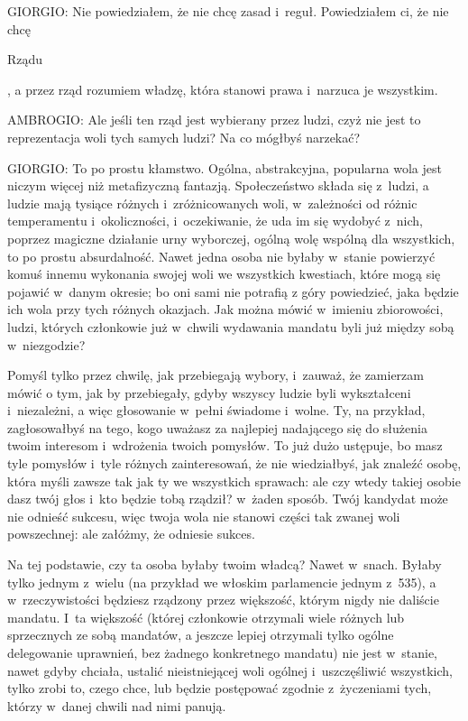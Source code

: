 \documentclass[oneside,polish,11pt,sfheadings]{mwbk}
\begin{document}
 
\noindent GIORGIO: Nie powiedziałem, że nie chcę zasad i~reguł. Powiedziałem ci, że nie chcę
\begin{itshape}Rządu \end{itshape}, a przez rząd rozumiem władzę, która stanowi prawa i~narzuca je wszystkim. 




 
\noindent AMBROGIO: Ale jeśli ten rząd jest wybierany przez ludzi, czyż nie jest to reprezentacja woli tych samych ludzi? Na co
mógłbyś narzekać? 




 
\noindent GIORGIO: To po prostu kłamstwo. Ogólna, abstrakcyjna, popularna wola jest niczym więcej niż metafizyczną fantazją.
Społeczeństwo składa się z~ludzi, a ludzie mają tysiące różnych i~zróżnicowanych woli, w~zależności od różnic
temperamentu i~okoliczności, i~oczekiwanie, że uda im się wydobyć z~nich, poprzez magiczne działanie urny wyborczej,
ogólną wolę wspólną dla wszystkich, to po prostu absurdalność. Nawet jedna osoba nie byłaby w~stanie powierzyć komuś
innemu wykonania swojej woli we wszystkich kwestiach, które mogą się pojawić w~danym okresie; bo oni sami nie potrafią
z góry powiedzieć, jaka będzie ich wola przy tych różnych okazjach. Jak można mówić w~imieniu zbiorowości, ludzi,
których członkowie już w~chwili wydawania mandatu byli już między sobą w~niezgodzie? 

 
Pomyśl tylko przez chwilę, jak przebiegają wybory, i~zauważ, że zamierzam mówić o tym, jak by przebiegały, gdyby wszyscy
ludzie byli wykształceni i~niezależni, a więc głosowanie w~pełni świadome i~wolne. Ty, na przykład, zagłosowałbyś na
tego, kogo uważasz za najlepiej nadającego się do służenia twoim interesom i~wdrożenia twoich pomysłów. To już dużo
ustępuje, bo masz tyle pomysłów i~tyle różnych zainteresowań, że nie wiedziałbyś, jak znaleźć osobę, która myśli zawsze
tak jak ty we wszystkich sprawach: ale czy wtedy takiej osobie dasz twój głos i~kto będzie tobą rządził? w~żaden
sposób. Twój kandydat może nie odnieść sukcesu, więc twoja wola nie stanowi części tak zwanej woli powszechnej: ale
załóżmy, że odniesie sukces. 

 
Na tej podstawie, czy ta osoba byłaby twoim władcą? Nawet w~snach. Byłaby tylko jednym z~wielu (na przykład we włoskim
parlamencie jednym z~535), a w~rzeczywistości będziesz rządzony przez większość, którym nigdy nie daliście mandatu. I~ta większość (której członkowie otrzymali wiele różnych lub sprzecznych ze sobą mandatów, a jeszcze lepiej otrzymali
tylko ogólne delegowanie uprawnień, bez żadnego konkretnego mandatu) nie jest w~stanie, nawet gdyby chciała, ustalić
nieistniejącej woli ogólnej i~uszczęśliwić wszystkich, tylko zrobi to, czego chce, lub będzie postępować zgodnie z~życzeniami tych, którzy w~danej chwili nad nimi panują. 
\end{document}
